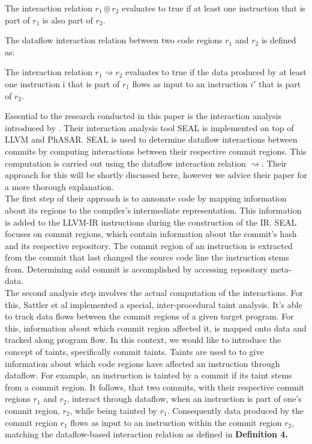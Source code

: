 \begin{definition}
	The interaction relation $r_1 \circledcirc r_2$ evaluates to true if at least one instruction that is part of $r_1$
	is also part of $r_2$.
\end{definition}

The dataflow interaction relation between two code regions $r_1$ and $r_2$ is defined as:

\begin{definition}
	The interaction relation $r_1 \rightsquigarrow r_2$ evaluates to true if the data produced by at least one instruction i that is part of $r_1$
	flows as input to an instruction $i'$ that is part of $r_2$.
\end{definition}

Essential to the research conducted in this paper is the interaction analysis introduced by \citet{sattler2023seal}.
Their interaction analysis tool SEAL is implemented on top of LLVM and PhASAR.
SEAL is used to determine dataflow interactions between commits by computing interactions between their respective commit regions.
This computation is carried out using the dataflow interaction relation $\rightsquigarrow$.
Their approach for this will be shortly discussed here, however we advice their paper for a more thorough explanation. \\
The first step of their approach is to annonate code by mapping information about its regions to the compiler's intermediate representation.
This information is added to the LLVM-IR instructions during the construction of the IR.
SEAL focuses on commit regions, which contain information about the commit's hash and its respective repository.
The commit region of an instruction is extracted from the commit that last changed the source code line the instruction stems from.
Determining said commit is accomplished by accessing repository meta-data. \\
The second analysis step involves the actual computation of the interactions.
For this, Sattler et al implemented a special, inter-procedural taint analysis.
It's able to track data flows between the commit regions of a given target program.
For this, information about which commit region affected it, is mapped onto data and tracked along program flow.
In this context, we would like to introduce the concept of taints, specifically commit taints.
Taints are used to to give information about which code regions have affected an instruction through dataflow.
For example, an instruction is tainted by a commit if its taint stems from a commit region.
It follows, that two commits, with their respective commit regions $r_1$ and $r_2$, interact through dataflow, when an instruction is part of one's commit region, $r_2$, while being tainted by $r_1$.
Consequently data produced by the commit region $r_1$ flows as input to an instruction within the commit region $r_2$, matching the dataflow-based interaction relation as defined in \textbf{Definition 4.}

